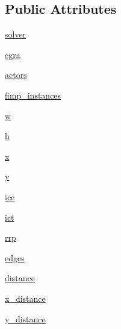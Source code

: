 \subsection*{Public Attributes}
\begin{DoxyCompactItemize}
\item 
\hyperlink{classsylva_1_1code__generation_1_1floorplanner_1_1floorplanner_af588b87074ee8449326528ea765f7bfb}{solver}
\item 
\hyperlink{classsylva_1_1code__generation_1_1floorplanner_1_1floorplanner_a74fc856bba52dfcaf42cac8f6e699f2f}{cgra}
\item 
\hyperlink{classsylva_1_1code__generation_1_1floorplanner_1_1floorplanner_aeb0a7c06073d6f238ca448fd31a08e75}{actors}
\item 
\hyperlink{classsylva_1_1code__generation_1_1floorplanner_1_1floorplanner_a9327be3c702c82f8c806449744e30d84}{fimp\+\_\+instances}
\item 
\hyperlink{classsylva_1_1code__generation_1_1floorplanner_1_1floorplanner_a4b3bde987121cd07a0e7247980060f29}{w}
\item 
\hyperlink{classsylva_1_1code__generation_1_1floorplanner_1_1floorplanner_ae267251903086826b4814d3a3358a40f}{h}
\item 
\hyperlink{classsylva_1_1code__generation_1_1floorplanner_1_1floorplanner_a30d871766e220d12a53bce833249cc57}{x}
\item 
\hyperlink{classsylva_1_1code__generation_1_1floorplanner_1_1floorplanner_a583eb5cc30fb2978384746da5b4b440f}{y}
\item 
\hyperlink{classsylva_1_1code__generation_1_1floorplanner_1_1floorplanner_a595a65d9ac2624c445577c600a1a2a59}{icc}
\item 
\hyperlink{classsylva_1_1code__generation_1_1floorplanner_1_1floorplanner_a18e4e4a27d7823aaa27a3cd10e55932f}{ict}
\item 
\hyperlink{classsylva_1_1code__generation_1_1floorplanner_1_1floorplanner_a2899535e11180a156b7a9479a9fe8701}{rrp}
\item 
\hyperlink{classsylva_1_1code__generation_1_1floorplanner_1_1floorplanner_a64cea72a08e610e84b7b3fda7b4cd034}{edges}
\item 
\hyperlink{classsylva_1_1code__generation_1_1floorplanner_1_1floorplanner_a24339289e4339174903ce5f41594c95d}{distance}
\item 
\hyperlink{classsylva_1_1code__generation_1_1floorplanner_1_1floorplanner_a1b95b56881d41dd6c5e1a66e6a6218cf}{x\+\_\+distance}
\item 
\hyperlink{classsylva_1_1code__generation_1_1floorplanner_1_1floorplanner_abf433d1b5543d12d04aba987eac72755}{y\+\_\+distance}

\end{DoxyCompactItemize}
